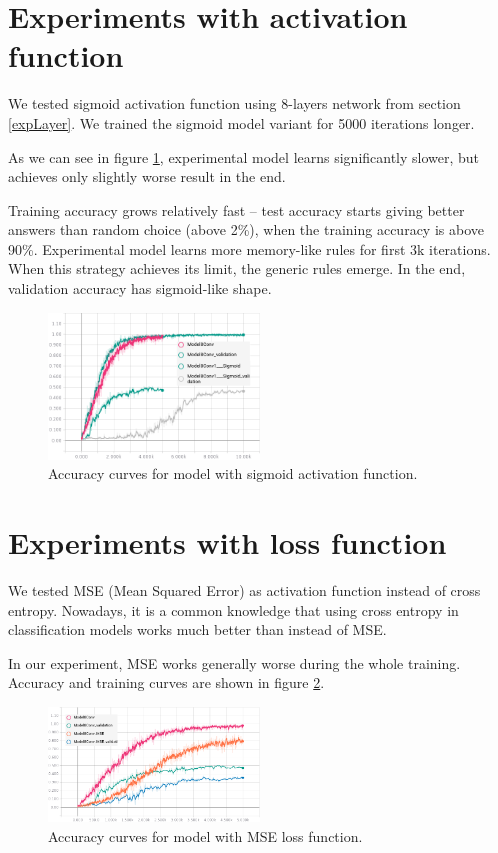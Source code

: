 \documentclass[a4paper]{article}
\begin{document}
\section{Experiments with activation function}

We tested sigmoid activation function using 8-layers network from section \ref{expLayer}.
We trained the sigmoid model variant for 5000 iterations longer.

As we can see in figure \ref{fig:sigmoid}, experimental model learns significantly slower,
but achieves only slightly worse result in the end.

Training accuracy grows relatively fast -- test accuracy
starts giving better answers than random choice (above 2\%),
when the training accuracy is above 90\%.
Experimental model learns more memory-like rules for first 3k iterations.
When this strategy achieves its limit, the generic rules emerge.
In the end, validation accuracy has sigmoid-like shape.



\begin{figure}[!h]
    \centering
    \includegraphics[page=2,width=0.5\textwidth]{sigmoidConv.png}
    \caption[]{Accuracy curves for model with sigmoid activation function.
    \label{fig:sigmoid}
    }
\end{figure}


\section{Experiments with loss function}

We tested MSE (Mean Squared Error) as activation function instead of cross entropy.
Nowadays, it is a common knowledge that using cross entropy in classification models works much better than instead of
MSE.

In our experiment, MSE works generally worse during the whole training. Accuracy and training curves are shown in figure \ref{fig:mse}.

\begin{figure}[!h]
    \centering
    \includegraphics[page=2,width=0.5\textwidth]{sqrLoss.png}
    \caption[]{Accuracy curves for model with MSE loss function.
    \label{fig:mse}
    }
\end{figure}
\end{document}
